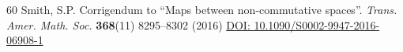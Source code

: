 \documentclass[reqno]{amsart}
\theoremstyle{definition}
\theoremstyle{remark}
\numberwithin{equation}{section}
\begin{document}
\begin{thebibliography}{60}
 Smith, S.P. Corrigendum to \textquotedblleft Maps between non-commutative spaces\textquotedblright. {\em Trans. Amer. Math. Soc.} {\bf 368}(11) 8295--8302 (2016) \href{https://doi.org/10.1090/S0002-9947-2016-06908-1}{DOI: 10.1090/S0002-9947-2016-06908-1}

 









\end{thebibliography}
\end{document}
